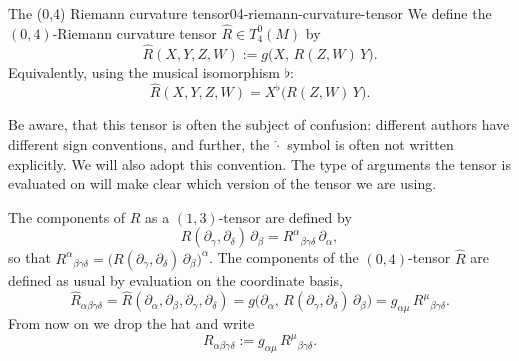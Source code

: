 \begin{colordef}{The (0,4) Riemann curvature tensor}{04-riemann-curvature-tensor}
We define the $(0,4)$-Riemann curvature tensor $\widehat{R} \in T^0_4(M)$ by
\[
\widehat R(X, Y, Z, W) := g\big(X,\, R(Z, W)\, Y\big).
\]
Equivalently, using the musical isomorphism $\flat$:
\[
\widehat R(X, Y, Z, W) = X^\flat\big(R(Z, W)\, Y\big).
\]
\end{colordef}

Be aware, that this tensor is often the subject of confusion: different authors have different sign conventions, and further, the $\widehat{\cdot}$ symbol is often not written explicitly. We will also adopt this convention. The type of arguments the tensor is evaluated on will make clear which version of the tensor we are using.

The components of $R$ as a $(1,3)$-tensor are defined by
\[
R(\partial_\gamma, \partial_\delta)\,\partial_\beta = R^\alpha{}_{\beta\gamma\delta}\,\partial_\alpha,
\]
so that $R^\alpha{}_{\beta\gamma\delta} = \big(R(\partial_\gamma, \partial_\delta)\,\partial_\beta\big)^\alpha$. The components of the $(0,4)$-tensor $\widehat R$ are defined as usual by evaluation on the coordinate basis,
\[
\widehat R_{\alpha\beta\gamma\delta} = \widehat R(\partial_\alpha, \partial_\beta, \partial_\gamma, \partial_\delta) = g\big(\partial_\alpha,\, R(\partial_\gamma, \partial_\delta)\,\partial_\beta\big) = g_{\alpha\mu}\, R^\mu{}_{\beta\gamma\delta}.
\]
From now on we drop the hat and write
\begin{equation}
    \label{eq:riemann-tensor-notation}
    R_{\alpha\beta\gamma\delta} := g_{\alpha\mu}\, R^\mu{}_{\beta\gamma\delta}.
\end{equation}













